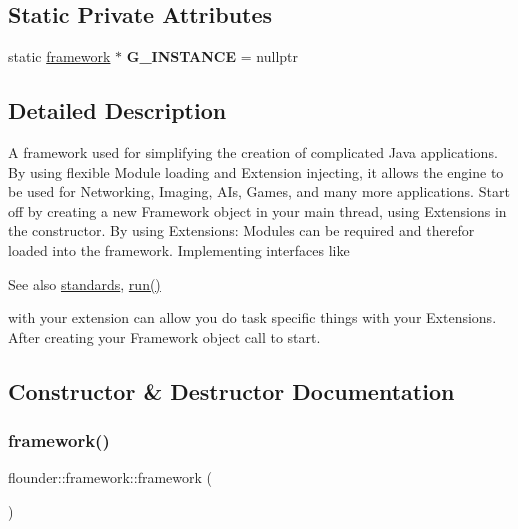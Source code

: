 \subsection*{Static Private Attributes}
\begin{DoxyCompactItemize}
\item 
\mbox{\label{classflounder_1_1framework_a896bceb89f218cbfc92592b1c24929e9}} 
static \hyperlink{classflounder_1_1framework}{framework} $\ast$ {\bfseries G\+\_\+\+I\+N\+S\+T\+A\+N\+CE} = nullptr
\end{DoxyCompactItemize}


\subsection{Detailed Description}
A framework used for simplifying the creation of complicated Java applications. By using flexible Module loading and Extension injecting, it allows the engine to be used for Networking, Imaging, A\+Is, Games, and many more applications. Start off by creating a new Framework object in your main thread, using Extensions in the constructor. By using Extensions\+: Modules can be required and therefor loaded into the framework. Implementing interfaces like \begin{DoxySeeAlso}{See also}
\hyperlink{classflounder_1_1standards}{standards}, \hyperlink{classflounder_1_1framework_aa3a73c8e8f5f0c6ccef3e4de89982434}{run()}


\end{DoxySeeAlso}
with your extension can allow you do task specific things with your Extensions. After creating your Framework object call  to start. 



\subsection{Constructor \& Destructor Documentation}
\mbox{\label{classflounder_1_1framework_ae7f076f63f78093952477e83174120f9}} 
\subsubsection{\texorpdfstring{framework()}{framework()}}
{\footnotesize\ttfamily flounder\+::framework\+::framework (\begin{DoxyParamCaption}{ }\end{DoxyParamCaption})}



